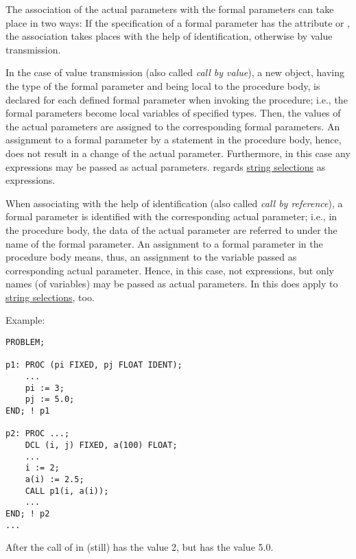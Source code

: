 The association of the actual parameters with the formal parameters can
take place in two ways: If the specification of a formal parameter has
the attribute  or ,
the association takes places with the
help of identification, otherwise by value transmission.

In the case of value transmission (also called {\em call by value}), a
new object, having the type of the formal parameter and being local to
the procedure body, is declared for each defined formal parameter when
invoking the procedure; i.e., the formal parameters become local
variables of specified types. Then, the values of the actual parameters
are assigned to the corresponding formal parameters. An assignment to a
formal parameter by a statement in the procedure body, hence, does not
result in a change of the actual parameter. Furthermore, in this case
any expressions may be passed as actual parameters.
\OpenPEARL{} regards \hyperlink{StringSelection}{string selections} as
expressions. 

When associating with the help of identification (also called {\em call
by reference}), a formal parameter is identified with the corresponding
actual parameter; i.e., in the procedure body, the data of the actual
parameter are referred to under the name of the formal parameter. An
assignment to a formal parameter in the procedure body means, thus, an
assignment to the variable passed as corresponding actual parameter.
Hence, in this case, not expressions, but only names (of variables) may
be passed as actual parameters. In \OpenPEARL{} this does apply to
\hyperlink{StringSelection}{string selections}, too.
 

Example:

\begin{lstlisting}
PROBLEM;
 
p1: PROC (pi FIXED, pj FLOAT IDENT);
    ... 
    pi := 3;
    pj := 5.0;
END; ! p1

p2: PROC ...;
    DCL (i, j) FIXED, a(100) FLOAT;
    ... 
    i := 2;
    a(i) := 2.5; 
    CALL p1(i, a(i));
    ... 
END; ! p2
... 
\end{lstlisting}

After the call of  in   (still) has the value 2,
 but  has the
value 5.0.


